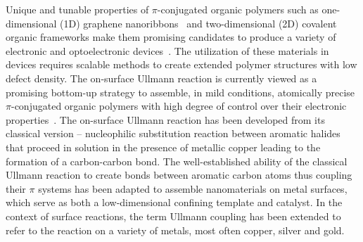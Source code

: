 \documentclass[%
 reprint,
 amsmath,amssymb,
 aps,
prb,
floatfix,
]{revtex4-2}
\newcommand{\lock}{\color{red}}
\newcommand{\lock}{\color{red}}
\newcommand{\comm}{\color{Purple}} %
\begin{document}
{\lock


Unique and tunable properties of $\pi$-conjugated organic polymers such as one-dimensional (1D) graphene nanoribbons~\cite{ullmann_106, ullmann_45, ullmann_107, ullmann_101}
and two-dimensional (2D) covalent organic frameworks 
make them promising candidates to produce a variety of electronic and optoelectronic devices~\cite{ullmann_113, ullmann_114}.
%
The utilization of these materials in devices requires scalable methods to create extended polymer structures with low defect density.
%
The on-surface Ullmann reaction is currently viewed as a promising bottom-up strategy to assemble, in mild conditions, atomically precise $\pi$-conjugated organic polymers with high degree of control over their electronic properties~\cite{ullmann_33}. 
%
%
The on-surface Ullmann reaction has been developed from its classical version -- nucleophilic substitution reaction between aromatic halides that proceed in solution in the presence of metallic copper leading to the formation of a carbon-carbon bond. 
The well-established ability of the classical Ullmann reaction to create bonds between aromatic carbon atoms thus coupling their $\pi$ systems has been adapted to assemble nanomaterials on metal surfaces, which serve as both a low-dimensional confining template and catalyst.
In the context of surface reactions, the term Ullmann coupling has been extended to refer to the reaction on a variety of metals, most often copper, silver and gold.

}
\end{document}
